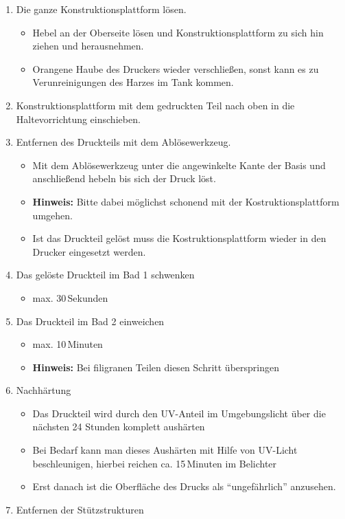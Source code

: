 \documentclass{\basedir/fablab-document}
\begin{document}
\begin{enumerate}
    \item Die ganze Konstruktionsplattform lösen.
        \begin{itemize}
            \item Hebel an der Oberseite lösen und Konstruktionsplattform zu sich hin ziehen und herausnehmen.
            \item Orangene Haube des Druckers wieder verschließen, sonst kann es zu Verunreinigungen des Harzes im Tank kommen.
        \end{itemize}
    \item Konstruktionsplattform mit dem gedruckten Teil nach oben in die Haltevorrichtung einschieben.
    \item Entfernen des Druckteils mit dem Ablösewerkzeug.
        \begin{itemize}
            \item Mit dem Ablösewerkzeug unter die angewinkelte Kante der Basis und anschließend hebeln bis sich der Druck löst.
            \item \textbf{Hinweis:} Bitte dabei möglichst schonend mit der Kostruktionsplattform umgehen.
            \item Ist das Druckteil gelöst muss die Kostruktionsplattform wieder in den Drucker eingesetzt werden.
        \end{itemize}
    \item Das gelöste Druckteil im Bad 1 schwenken
        \begin{itemize}
            \item max. 30\,Sekunden
        \end{itemize}
    \item Das Druckteil im Bad 2 einweichen
        \begin{itemize}
            \item max. 10\,Minuten
            \item \textbf{Hinweis:} Bei filigranen Teilen diesen Schritt überspringen
        \end{itemize}
    \item Nachhärtung
        \begin{itemize}
            \item Das Druckteil wird durch den UV-Anteil im Umgebungslicht über die nächsten 24 Stunden komplett aushärten
            \item Bei Bedarf kann man dieses Aushärten mit Hilfe von UV-Licht beschleunigen, hierbei reichen ca. 15\,Minuten im Belichter
            \item Erst danach ist die Oberfläche des Drucks als \enquote{ungefährlich} anzusehen.
        \end{itemize}
    \item Entfernen der Stützstrukturen

\end{enumerate}
\end{document}
